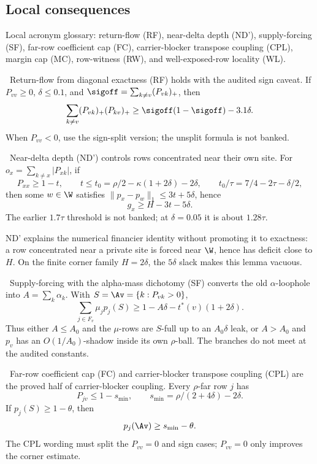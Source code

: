 \subsection{Local consequences}
Local acronym glossary: return-flow (RF), near-delta depth (ND'), supply-forcing (SF), far-row coefficient cap (FC), carrier-blocker transpose coupling (CPL), margin cap (MC), row-witness (RW), and well-exposed-row locality (WL).
\begin{lemma}
\modauditbadge\ Return-flow from diagonal exactness (RF) holds with the audited sign caveat.
If \(P_{vv}\ge0\), \(\delta\le0.1\),
and \(\sigoff=\sum_{k\ne v}(P_{vk})_+\), then
\[
  \sum_{k\ne v}(P_{vk})_+(P_{kv})_+\ge\sigoff(1-\sigoff)-3.1\delta .
\]
When \(P_{vv}<0\), use the sign-split version; the unsplit formula is not banked.
\end{lemma}
\begin{lemma}
\modauditbadge\ Near-delta depth (ND') controls rows concentrated near their own site.  For
\(o_x=\sum_{k\ne x}|P_{xk}|\), if
\[
  P_{xx}\ge1-t,\qquad t\le t_0=\rho/2-\kappa(1+2\delta)-2\delta,\qquad
  t_0/\tau=7/4-2\tau-\delta/2,
\]
then some \(w\in\W\) satisfies \(\|p_x-p_w\|_1\le3t+5\delta\), hence
\[
  g_x\ge H-3t-5\delta .
\]
The earlier \(1.7\tau\) threshold is not banked; at \(\delta=0.05\) it is about \(1.28\tau\).
\end{lemma}
ND' explains the numerical financier identity without promoting it to exactness: a row
concentrated near a private site is forced near \(\W\), hence has deficit close to \(H\).
On the finite corner family \(H=2\delta\), the \(5\delta\) slack makes this lemma vacuous.
\begin{lemma}
\provedbadge\ Supply-forcing with the alpha-mass dichotomy (SF) converts the old
\(\alpha\)-loophole into \(A=\sum_k\alpha_k\).  With
\(S=\Av=\{k:P_{vk}>0\}\),
\[
  \sum_{j\in F_v}\mu_jp_j(S)\ge1-A\delta-t^*(v)(1+2\delta).
\]
Thus either \(A\le A_0\) and the \(\mu\)-rows are \(S\)-full up to an \(A_0\delta\) leak, or
\(A>A_0\) and \(p_v\) has an \(O(1/A_0)\)-shadow inside its own \(\rho\)-ball.  The branches
do not meet at the audited constants.
\end{lemma}
\begin{lemma}
\modauditbadge\ Far-row coefficient cap (FC) and carrier-blocker transpose coupling (CPL)
are the proved half of carrier-blocker coupling.  Every
\(\rho\)-far row \(j\) has
\[
  P_{jv}\le1-s_{\min},\qquad s_{\min}=\rho/(2+4\delta)-2\delta .
\]
If \(p_j(S)\ge1-\theta\), then
\[
  p_j(\Av)\ge s_{\min}-\theta .
\]
The CPL wording must split the \(P_{vv}=0\) and sign cases; \(P_{vv}=0\) only improves the
corner estimate.
\end{lemma}
